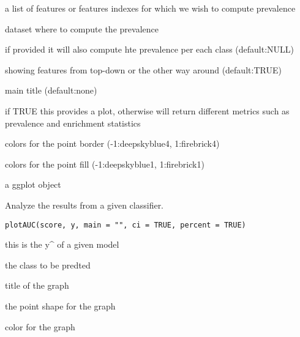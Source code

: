 \documentclass[a4paper]{book}
\begin{document}
%
\begin{Arguments}
\begin{ldescription}
\item[\code{features:}] a list of features or features indexes for which we wish to compute prevalence

\item[\code{X:}] dataset where to compute the prevalence

\item[\code{y:}] if provided it will also compute hte prevalence per each class (default:NULL)

\item[\code{topdown:}] showing features from top-down or the other way around (default:TRUE)

\item[\code{main:}] main title (default:none)

\item[\code{plot:}] if TRUE this provides a plot, otherwise will return different metrics such as prevalence and enrichment statistics

\item[\code{col.pt:}] colors for the point border (-1:deepskyblue4, 1:firebrick4)

\item[\code{col.bg:}] colors for the point fill (-1:deepskyblue1, 1:firebrick1)
\end{ldescription}
\end{Arguments}
%
\begin{Value}
a ggplot object
\end{Value}
%
\begin{Description}
Analyze the results from a given classifier.
\end{Description}
%
\begin{Usage}
\begin{verbatim}
plotAUC(score, y, main = "", ci = TRUE, percent = TRUE)
\end{verbatim}
\end{Usage}
%
\begin{Arguments}
\begin{ldescription}
\item[\code{score:}] this is the y\textasciicircum{} of a given model

\item[\code{y:}] the class to be predted

\item[\code{main:}] title of the graph

\item[\code{ci:}] the point shape for the graph

\item[\code{percent:}] color for the graph
\end{ldescription}
\end{Arguments}
\end{document}
